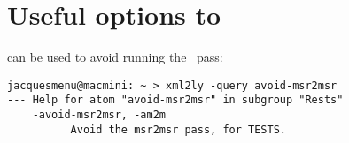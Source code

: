 \section{Useful options to \xmlToLy\ }

 can be used to avoid running the \msrToMsr\ pass:
\begin{lstlisting}[language=Terminal]
jacquesmenu@macmini: ~ > xml2ly -query avoid-msr2msr
--- Help for atom "avoid-msr2msr" in subgroup "Rests"
    -avoid-msr2msr, -am2m
          Avoid the msr2msr pass, for TESTS.
\end{lstlisting}
